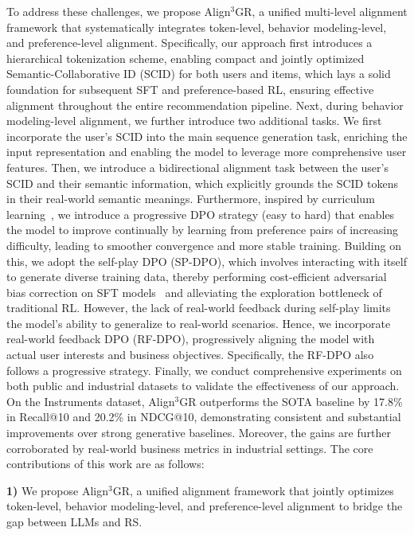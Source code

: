 \documentclass[letterpaper]{article} %
\begin{document}
%
To address these challenges, we propose Align$^3$GR, a unified multi-level alignment framework that systematically integrates token-level, behavior modeling-level, and preference-level alignment. Specifically, our approach first introduces a hierarchical tokenization scheme, enabling compact and jointly optimized Semantic-Collaborative ID (SCID) for both users and items, which lays a solid foundation for subsequent SFT and preference-based RL, ensuring effective alignment throughout the entire recommendation pipeline.
Next, during behavior modeling-level alignment, we further introduce two additional tasks. We first incorporate the user's SCID into the main sequence generation task, enriching the input representation and enabling the model to leverage more comprehensive user features. Then, we introduce a bidirectional alignment task between the user’s SCID and their semantic information, which explicitly grounds the SCID tokens in their real-world semantic meanings.
%
Furthermore, inspired by curriculum learning~\cite{llara}, we introduce a progressive DPO strategy (easy to hard) that enables the model to improve continually by learning from preference pairs of increasing difficulty, leading to smoother convergence and more stable training. 
%
Building on this, we adopt the self-play DPO (SP-DPO), which involves interacting with itself to generate diverse training data, thereby performing cost-efficient adversarial bias correction on SFT models~\cite{spdpo} and alleviating the exploration bottleneck of traditional RL. However, the lack of real-world feedback during self-play limits the model’s ability to generalize to real-world scenarios. Hence, we incorporate real-world feedback DPO (RF-DPO), progressively aligning the model with actual user interests and business objectives. Specifically, the RF-DPO also follows a progressive strategy. Finally, we conduct comprehensive experiments on both public and industrial datasets to validate the effectiveness of our approach. On the Instruments dataset, Align$^3$GR outperforms the SOTA baseline by 17.8\% in Recall@10 and 20.2\% in NDCG@10, demonstrating consistent and substantial improvements over strong generative baselines. Moreover, the gains are further corroborated by real-world business metrics in industrial settings. The core contributions of this work are as follows:
%

%
\textbf{1)} We propose Align$^3$GR, a unified alignment framework that jointly optimizes token-level, behavior modeling-level, and preference-level alignment to bridge the gap between LLMs and RS.
%
\end{document}
